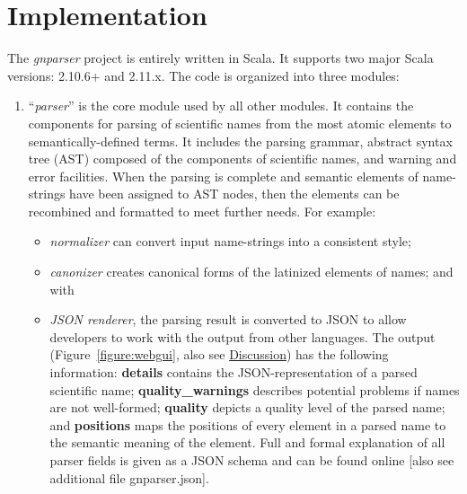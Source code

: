 \documentclass{bmcart}
\begin{document}
\section*{Implementation}

The \textit{gnparser} project is entirely written in Scala. It supports two
major Scala versions: 2.10.6+ and 2.11.x. The code is organized into three
modules:

\begin{enumerate}

  \item ``\textit{parser}'' is the core module used by all other modules. It
    contains the components for parsing of scientific names from the most
    atomic elements to semantically-defined terms. It includes the parsing
    grammar, abstract syntax tree (AST) composed of the components of
    scientific names, and warning and error facilities.  When the parsing is
    complete and semantic elements of name-strings have been assigned to AST
    nodes, then the elements can be recombined and formatted to meet further
    needs.  For example:

\begin{itemize}

  \item \textit{normalizer} can convert input name-strings into a consistent
    style;

  \item \textit{canonizer} creates canonical forms of the latinized elements of
    names; and with

  \item \textit{JSON renderer}, the parsing result is converted to JSON
    \cite{bray2014javascript} to allow developers to work with the output from
    other languages. The output (Figure~\ref{figure:webgui}, also see
    \hyperref[sec:discussion]{Discussion}) has the following information:
    \textbf{details} contains the JSON-representation of a parsed scientific
    name; \textbf{quality\_warnings} describes potential problems if names are
    not well-formed; \textbf{quality} depicts a quality level of the parsed
    name;  and \textbf{positions} maps the positions of every element in a
    parsed name to the semantic meaning of the element. Full and formal
    explanation of all parser fields is given as a JSON schema and can be found
    online \cite{gnparser-json} [also see additional file gnparser.json].

\end{itemize}


\end{enumerate}
\end{document}
